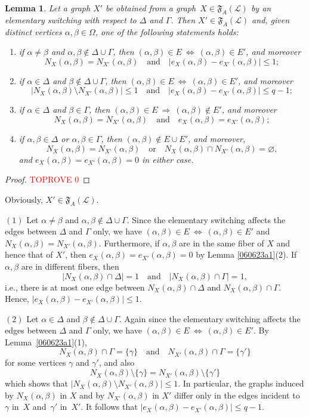 \documentclass{amsart}
\newcommand{\cal}{\mathcal}
\newtheorem{lemma}[formula]{Lemma}
\def\nmrt{\begin{enumerate}}
\def\enmrt{\end{enumerate}}
\def\tm#1{\item[{\rm (#1)}]}
\def\lmml#1{\begin{lemma}\label{#1}}
\def\elmm{\end{lemma}}
\def\prf{\begin{proof}\textcolor{red}{TOPROVE 0}\end{proof}}
\def\cL{{\cal L}}
\def\fF{{\mathfrak F}}
\def\qaq{\quad\text{and}\quad}
\def\qoq{\quad\text{or}\quad}
\begin{document}
\lmml{060623w}
Let  a graph $X'$ be obtained from a graph~$X\in\fF_A(\cL)$ by an elementary switching with respect to  $\Delta$ and $\Gamma$. Then $X'\in\fF_A(\cL)$ and, given distinct vertices $\alpha,\beta\in\Omega$, one of the following statements holds:
\nmrt
\tm{1} if $\alpha\ne \beta$ and $\alpha,\beta\not\in \Delta\cup \Gamma$, then $(\alpha,\beta)\in E\ \Leftrightarrow\ (\alpha,\beta)\in E'$, and moreover
$$
N_{X^{}}(\alpha,\beta)=N_{X'}(\alpha,\beta) \qaq |e_{X^{}}(\alpha,\beta)-e_{X'}(\alpha,\beta)|\le 1;
$$
\tm{2}  if $\alpha\in\Delta$  and $\beta\not\in \Delta\cup \Gamma$, then $(\alpha,\beta)\in E\ \Leftrightarrow\ (\alpha,\beta)\in E'$, and moreover
$$
|N_{X^{}}(\alpha,\beta)\setminus N_{X'}(\alpha,\beta)|\le 1 \qaq |e_{X^{}}(\alpha,\beta)-e_{X'}(\alpha,\beta)|\le q-1;
$$
\tm{3}  if $\alpha\in\Delta$  and $\beta\in \Gamma$, then $(\alpha,\beta)\in E\ \Rightarrow\ (\alpha,\beta)\not\in E'$, and moreover
$$
N_{X^{}}(\alpha,\beta)=N_{X'}(\alpha,\beta)  \qaq e_{X^{}}(\alpha,\beta)=e_{X'}(\alpha,\beta);
$$
\tm{4}  if $\alpha,\beta\in\Delta$ or $\alpha,\beta\in\Gamma$,  then $(\alpha,\beta)\not\in E\cup E'$, and moreover,
$$
N_{X^{}}(\alpha,\beta)=N_{X'}(\alpha,\beta) \qoq
N_{X^{}}(\alpha,\beta)\cap  N_{X'}(\alpha,\beta)=\varnothing,
$$
and $e_{X^{}}(\alpha,\beta)=e_{X'}(\alpha,\beta)=0$ 
in either case.
\enmrt
\elmm
\prf 
Obviously, $X'\in \fF_A(\cL)$.

$(1)$ Let $\alpha\ne \beta$ and $\alpha,\beta\not\in \Delta\cup \Gamma$. Since the elementary switching  affects the edges between $\Delta$ and $\Gamma$ only, we have  $(\alpha,\beta)\in E\ \Leftrightarrow\ (\alpha,\beta)\in E'$ and $N_{X^{}}(\alpha,\beta)=N_{X'}(\alpha,\beta)$. Furthermore, if  $\alpha,\beta$ are in the same fiber of $X$ and hence that of $X'$, then  $e_{X^{}}(\alpha,\beta)=e_{X'}(\alpha,\beta)=0$ by Lemma \ref{060623a1}(2). If $\alpha,\beta$ are in different fibers, then 
 $$
 |N_{X^{}}(\alpha,\beta)\cap \Delta|=1 \qaq |N_{X^{}}(\alpha,\beta)\cap \Gamma|=1,
 $$ 
 i.e., there is at most one edge between $N_{X^{}}(\alpha,\beta)\cap \Delta$ and $N_{X^{}}(\alpha,\beta)\cap \Gamma$. Hence, $|e_{X^{}}(\alpha,\beta)-e_{X'}(\alpha,\beta)|\le 1$.

$(2)$ Let $\alpha\in\Delta$  and $\beta\not\in \Delta\cup \Gamma$. Again since the elementary switching affects the edges between $\Delta$ and $\Gamma$ only, we have $(\alpha,\beta)\in E\ \Leftrightarrow\ (\alpha,\beta)\in E'$. By  Lemma~\ref{060623a1}(1),
$$
N_{X}(\alpha,\beta)\cap \Gamma=\{\gamma\}\qaq N_{X'}(\alpha,\beta)\cap \Gamma=\{\gamma '\}
$$
for some vertices $\gamma$ and $\gamma'$, and also 
$$
N_{X^{}}(\alpha,\beta)\setminus \{\gamma\}= N_{X'}(\alpha,\beta)\setminus \{\gamma ' \}
$$ 
which shows that $|N_{X^{}}(\alpha,\beta)\setminus N_{X'}(\alpha,\beta)|\le 1 $. In particular, the graphs induced by $N_{X^{}}(\alpha,\beta)$ in $X$ and  by $N_{X'}(\alpha,\beta)$ in $X'$ differ only in the edges incident to $\gamma$ in~$X$ and~$\gamma'$ in~$X'$. It follows that  $|e_{X^{}}(\alpha,\beta)-e_{X'}(\alpha,\beta)|\le q-1$.
\end{document}
